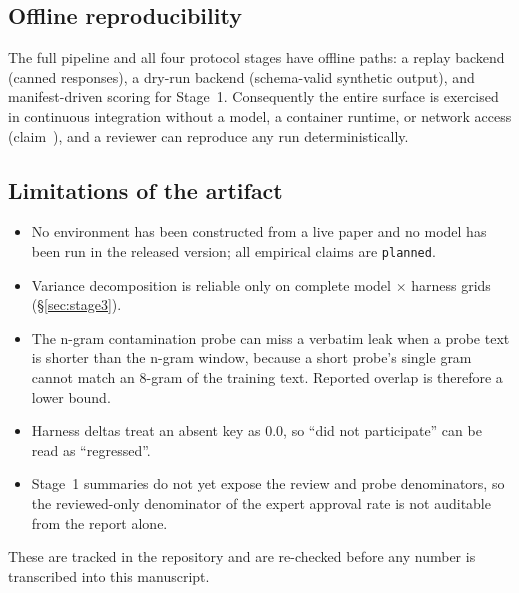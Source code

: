 \subsection{Offline reproducibility}

The full pipeline and all four protocol stages have offline paths: a replay
backend (canned responses), a dry-run backend (schema-valid synthetic output),
and manifest-driven scoring for Stage~1. Consequently the entire surface is
exercised in continuous integration without a model, a container runtime, or
network access (claim~), and a reviewer can reproduce any run
deterministically.

\subsection{Limitations of the artifact}
\label{app:limits}

\begin{itemize}
  \item No environment has been constructed from a live paper and no model has
        been run in the released version; all empirical claims are
        \texttt{planned}.
  \item Variance decomposition is reliable only on complete model $\times$
        harness grids (\S\ref{sec:stage3}).
  \item The n-gram contamination probe can miss a verbatim leak when a probe
        text is shorter than the n-gram window, because a short probe's single
        gram cannot match an 8-gram of the training text. Reported overlap is
        therefore a lower bound.
  \item Harness deltas treat an absent key as $0.0$, so ``did not participate''
        can be read as ``regressed''.
  \item Stage~1 summaries do not yet expose the review and probe denominators,
        so the reviewed-only denominator of the expert approval rate is not
        auditable from the report alone.
\end{itemize}

\noindent These are tracked in the repository and are re-checked before any
number is transcribed into this manuscript.
